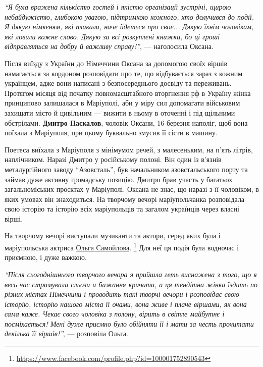 \begin{leftbar}
\emph{\enquote{Я була вражена кількістю гостей і якістю організації зустрічі, щирою
небайдужістю, глибокою увагою, підтримкою кожного, хто долучився до
події. Я дякую німкеням, які плакали, наче йдеться про своє... Дякую
їхнім чоловікам, які ловили кожне слово. Дякую за всі розкуплені
книжки, бо ці гроші відправляться на добру й важливу справу!}}, —
наголосила Оксана.
\end{leftbar}


Після виїзду з України до Німеччини Оксана за допомогою своїх віршів
намагається за кордоном розповідати про те, що відбувається зараз з кожним
українцем, адже вони написані з безпосереднього досвіду та переживань. Протягом
місяця від початку повномасштабного вторгнення рф в Україну жінка принципово
залишалася в Маріуполі, аби у міру сил допомагати військовим захищати місто й
цивільним — вижити в ньому в оточенні і під щільними обстрілами. \textbf{Дмитро
Паскалов}, чоловік Оксани, 16 березня наполіг, щоб вона поїхала з Маріуполя, при
цьому буквально змусив її сісти в машину.

Поетеса виїхала з Маріуполя з мінімумом речей, з малесеньким, на п'ять літрів,
наплічником. Наразі Дмитро у російському полоні. Він один із в'язнів
металургійного заводу \enquote{Азовсталь}, був начальником азовстальського порту та
займав дуже активну громадську позицію. Дмитро брав участь у багатьох
загальноміських проєктах у Маріуполі. Оксана не знає, що наразі з її чоловіком,
в яких умовах він знаходиться. На творчому вечорі маріупольчанка розповідала
свою історію та історію всіх маріупольців та загалом українців через власні
вірші.



На творчому вечорі виступали музиканти та актори, серед яких була і
маріупольська актриса \href{https://www.facebook.com/profile.php?id=100001752890543}{Ольга Самойлова}.%
\footnote{\url{https://www.facebook.com/profile.php?id=100001752890543}}
Для неї ця подія була водночас і приємною, і дуже важкою.

\begin{leftbar}
\emph{\enquote{Після сьогоднішнього творчого вечора я прийшла геть виснажена з того, що я
весь час стримувала сльози и бажання кричати, а ця тендітна жінка
їздить по різних містах Німеччини і проводить такі творчі вечори і
розповідає свою історію, історію нашого міста її очами, вона живе і
плаче віршами, як вона сама каже. Чекає свого чоловіка з полону, вірить
в світле майбутнє і посміхається! Мені дуже приємно було обійняти її і
мати за честь прочитати декілька її віршів!}}, — розповіла Ольга.
\end{leftbar}

